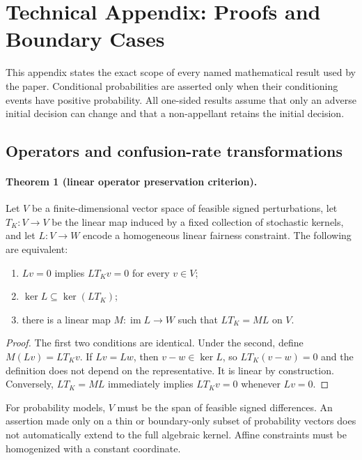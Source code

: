 \section{Technical Appendix: Proofs and Boundary Cases}
\label{app:proofs}

This appendix states the exact scope of every named mathematical result used
by the paper.  Conditional probabilities are asserted only when their
conditioning events have positive probability.  All one-sided results assume
that only an adverse initial decision can change and that a non-appellant
retains the initial decision.

\subsection{Operators and confusion-rate transformations}

\paragraph{Theorem 1 (linear operator preservation criterion).}
Let $V$ be a finite-dimensional vector space of feasible signed
perturbations, let $T_K:V\to V$ be the linear map induced by a fixed
collection of stochastic kernels, and let $L:V\to W$ encode a homogeneous
linear fairness constraint.  The following are equivalent:
\begin{enumerate}
  \item $Lv=0$ implies $LT_Kv=0$ for every $v\in V$;
  \item $\ker L\subseteq\ker(LT_K)$;
  \item there is a linear map $M:\operatorname{im}L\to W$ such that
        $LT_K=ML$ on $V$.
\end{enumerate}

\begin{proof}
The first two conditions are identical.  Under the second, define
$M(Lv)=LT_Kv$.  If $Lv=Lw$, then $v-w\in\ker L$, so
$LT_K(v-w)=0$ and the definition does not depend on the representative.
It is linear by construction.  Conversely, $LT_K=ML$ immediately implies
$LT_Kv=0$ whenever $Lv=0$.
\end{proof}

For probability models, $V$ must be the span of feasible signed differences.
An assertion made only on a thin or boundary-only subset of probability
vectors does not automatically extend to the full algebraic kernel.  Affine
constraints must be homogenized with a constant coordinate.

